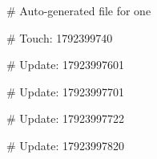 # Auto-generated file for one

# Touch: 1792399740

# Update: 17923997601

# Update: 17923997701

# Update: 17923997722

# Update: 17923997820

